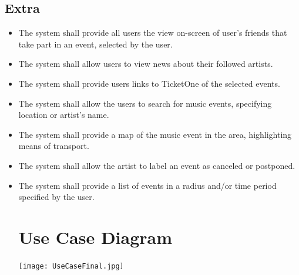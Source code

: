 \documentclass[11pt,a4paper]{article}
\begin{document}
\subsection{Extra}
\begin{itemize}
\item The system shall provide all users the view on-screen of user’s friends that take part in an event, selected by the user.
\item The system shall allow users to view news about their followed artists.
\item The system shall provide users links to TicketOne of the selected events.
\item The system shall allow the users to search for music events, specifying location or artist’s name.
\item The system shall provide a map of the music event in the area, highlighting means of transport.
\item The system shall allow the artist to label an event as canceled or postponed.
\item The system shall provide a list of events in a radius and/or time period specified by the user.
\section{Use Case Diagram}
\hspace*{-4cm}  
\texttt{[image: UseCaseFinal.jpg]}

\end{itemize}
\end{document}
